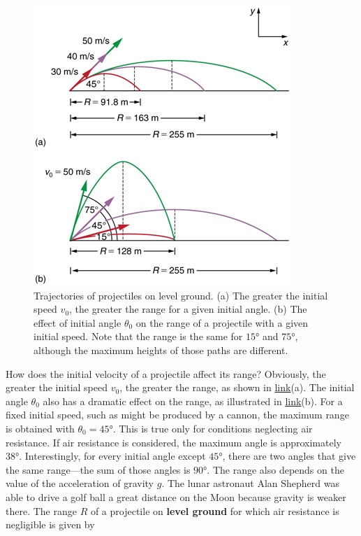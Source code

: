 \documentclass[
]{book}
\begin{document}
\begin{figure}
\hypertarget{import-auto-id1904800}{%
\centering
\includegraphics{images/Figure_03_04_05a.jpg}
\caption{Trajectories of projectiles on level ground. (a) The greater the
initial speed \(v_{0}{}\), the greater the range for a given initial
angle. (b) The effect of initial angle \(\theta_{0}{}\) on the range of a
projectile with a given initial speed. Note that the range is the same
for \(\text{15°}{}\) and \(\text{75°}{}\), although the maximum heights of
those paths are
different.}\label{import-auto-id1904800}
}
\end{figure}

How does the initial velocity of a projectile affect its range?
Obviously, the greater the initial speed \(v_{0}{}\), the greater the
range, as shown in
\protect\hyperlink{import-auto-id1904800}{link}(a). The initial
angle \(\theta_{0}{}\) also has a dramatic effect on the range, as
illustrated in
\protect\hyperlink{import-auto-id1904800}{link}(b). For a fixed
initial speed, such as might be produced by a cannon, the maximum range
is obtained with \({\theta_{0} = \text{45°}}{}\). This is true only for
conditions neglecting air resistance. If air resistance is considered,
the maximum angle is approximately \(\text{38°}{}\). Interestingly, for
every initial angle except \(\text{45°}{}\), there are two angles that
give the same range---the sum of those angles is \(\text{90°}{}\). The
range also depends on the value of the acceleration of gravity \(g{}\).
The lunar astronaut Alan Shepherd was able to drive a golf ball a great
distance on the Moon because gravity is weaker there. The range \(R{}\) of
a projectile on \textbf{level ground} for which air resistance is negligible
is given by
\end{document}
